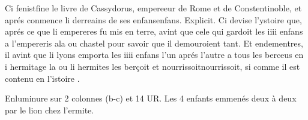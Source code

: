 \documentclass{article}
\begin{document}
\begin{pages}
            Ci 
               fenistfine le livre de 
               Cassydorus, 
               empereeur de Rome et 
               de Constentinoble, 
               et aprés conmence li derreains de ses 
               enfansenfans. Explicit.
            Ci devise l’ystoire que, 
               aprés ce que li empereres fu mis en terre, 
               avint que cele qui gardoit les 
                  iiii enfans a l’empereris 
               ala ou chastel pour savoir que 
               il demouroient tant. Et endementres, il avint que 
               li lyons emporta les iiii enfans l’un aprés l’autre a 
               tous les berceus en i hermitage la ou 
               li hermites les berçoit et 
               nourrissoitnourrissoit, si comme il est contenu en l'istoire
               .
            
               Enluminure sur 2 colonnes (b-c) et 14 UR.
                  Les 4 enfants emmenés deux à deux par le lion
                  chez l’ermite. 
               
            
         
      
  

\end{pages}
\end{document}
